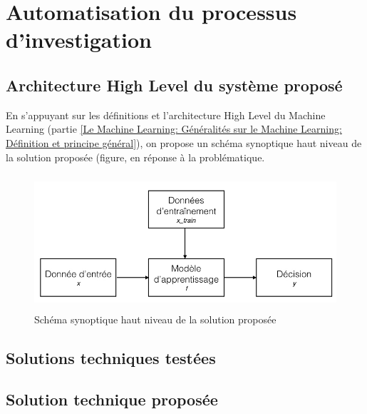 \chapter{Automatisation du processus d'investigation}
\label{Automatisation du processus d'investigation}
\thispagestyle{fancy}


\section{Architecture High Level du système proposé}
\label{Automatisation du processus d'investigation: Achitecture High Level du système proposé}
En s'appuyant sur les définitions et l'architecture High Level du Machine Learning (partie \ref{Le Machine Learning: Généralités sur le Machine Learning: Définition et principe général}), on propose un schéma synoptique haut niveau de la solution proposée (figure, en réponse à la problématique. 

\begin{figure}[h]
	\centering\includegraphics[height=5cm]{images/ML_high_level.jpeg}
	\caption{Schéma synoptique haut niveau de la solution proposée}
	\label{fig:Schéma synoptique haut niveau de la solution proposée}
\end{figure}

\section{Solutions techniques testées}
\label{Automatisation du processus d'investigation: Solutions techniques testées}




\section{Solution technique proposée}
\label{Automatisation du processus d'investigation: Solution technique proposée}

